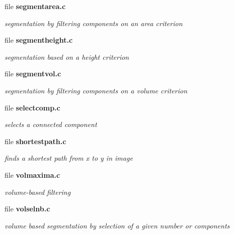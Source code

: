 \begin{CompactItemize}
\item 
file \bf{segmentarea.c}
\begin{CompactList}\small\item\em segmentation by filtering components on an area criterion \item\end{CompactList}

\item 
file \bf{segmentheight.c}
\begin{CompactList}\small\item\em segmentation based on a height criterion \item\end{CompactList}

\item 
file \bf{segmentvol.c}
\begin{CompactList}\small\item\em segmentation by filtering components on a volume criterion \item\end{CompactList}

\item 
file \bf{selectcomp.c}
\begin{CompactList}\small\item\em selects a connected component \item\end{CompactList}

\item 
file \bf{shortestpath.c}
\begin{CompactList}\small\item\em finds a shortest path from x to y in image \item\end{CompactList}

\item 
file \bf{volmaxima.c}
\begin{CompactList}\small\item\em volume-based filtering \item\end{CompactList}

\item 
file \bf{volselnb.c}
\begin{CompactList}\small\item\em volume based segmentation by selection of a given number or components \item\end{CompactList}


\end{CompactItemize}
